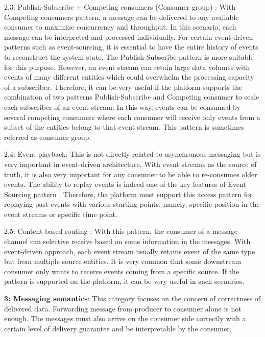 2.3: Publish-Subscribe + Competing consumers (Consumer group) \cite{messagingcompetingconsumer}:
With Competing consumers pattern, a message can be delivered to any available consumer to maximize concurrency and throughput. In this scenario, each message can be interpreted and processed individually. For certain event-driven patterns such as event-sourcing, it is essential to have the entire history of events to reconstruct the system state. The Publish-Subscribe pattern is more suitable for this purpose. However, an event stream can retain large data volumes with events of many different entities which could overwhelm the processing capacity of a subscriber. Therefore, it can be very useful if the platform supports the combination of two patterns Publish-Subscribe and Competing consumer to scale each subscriber of an event stream. In this way, events can be consumed by several competing consumers where each consumer will receive only events from a subset of the entities belong to that event stream. This pattern is sometimes referred as consumer group.

2.4: Event playback: This is not directly related to asynchronous messaging but is very important in event-driven architecture. With event streams as the source of truth, it is also very important for any consumer to be able to re-consumes older events. The ability to replay events is indeed one of the key features of Event Sourcing pattern \cite{eventsourcingfowler}. Therefore, the platform must support this access pattern for replaying past events with various starting points, namely, specific position in the event streams or specific time point.

2.5: Content-based routing \cite{messagingcontainedbasedrouter}: 
With this pattern, the consumer of a message channel can selective receive based on some information in the messages. With event-driven approach, each event stream usually retains event of the same type but from multiple source entities. It is very common that some downstream consumer only wants to receive events coming from a specific source. If the pattern is supported on the platform, it can be very useful in such scenarios. 

\textbf{3: Messaging semantics}: This category focuses on the concern of correctness of delivered data. Forwarding message from producer to consumer alone is not enough. The messages must also arrive on the consumer side correctly with a certain level of delivery guarantee and be interpretable by the consumer. 

